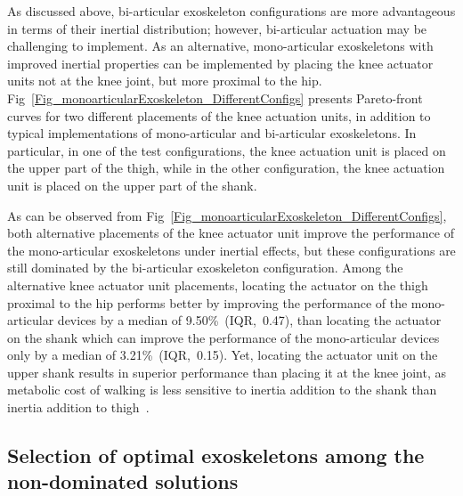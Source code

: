 \documentclass[10pt,letterpaper]{article}
\begin{document}

As discussed above, bi-articular exoskeleton configurations are more advantageous in terms of their inertial distribution; however, bi-articular actuation may be challenging to implement. As an alternative, mono-articular exoskeletons with improved inertial properties can be implemented by placing the knee actuator units not at the knee joint, but more proximal to the hip. Fig~\ref{Fig_monoarticularExoskeleton_DifferentConfigs} presents Pareto-front curves for two different placements of the knee actuation units, in addition to typical implementations of mono-articular and bi-articular exoskeletons. In particular, in one of the test configurations, the knee actuation unit is placed on the upper part of the thigh, while in the other configuration, the knee actuation unit is placed on the upper part of the shank.

As can be observed from Fig~\ref{Fig_monoarticularExoskeleton_DifferentConfigs}, both alternative placements of the knee actuator unit improve the performance of the mono-articular exoskeletons under inertial effects, but these configurations are still dominated by the bi-articular exoskeleton configuration. Among the alternative knee actuator unit placements, locating the actuator on the thigh proximal to the hip performs better by improving the performance of the mono-articular devices by a median of 9.50\%~(IQR,~0.47), than locating the actuator on the shank which can improve the performance of the mono-articular devices only by a median of 3.21\%~(IQR,~0.15). Yet, locating the actuator unit on the upper shank results in superior performance than placing it at the knee joint, as metabolic cost of walking is less sensitive to inertia addition to the shank than inertia addition to thigh~\cite{Browning2007}.



\subsection*{Selection of optimal exoskeletons among the non-dominated solutions}
\end{document}
